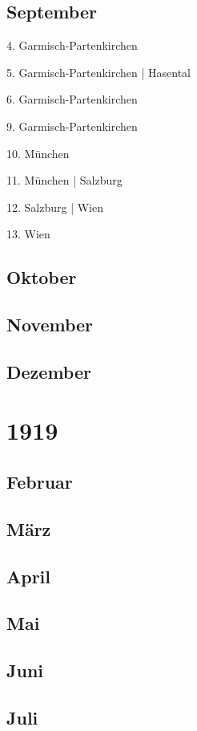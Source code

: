 \documentclass[twoside=false,titlepage=false,open=any, parskip=never, fontsize=10pt, headings=small, chapterprefix=false, appendixprefix=false, DIV=15]{scrbook}
\begin{document}
\begin{multicols}{3}
            \section*{September}
            4. Garmisch-Partenkirchen\par
            5. Garmisch-Partenkirchen | Hasental\par
            6. Garmisch-Partenkirchen\par
            9. Garmisch-Partenkirchen\par
            10. München\par
            11. München | Salzburg\par
            12. Salzburg | Wien\par
            13. Wien\par
            \section*{Oktober}
            \section*{November}
            \section*{Dezember}
            \chapter*{1919}
            \section*{Februar}
            \section*{März}
            \section*{April}
            \section*{Mai}
            \section*{Juni}
            \section*{Juli}

\end{multicols}
\end{document}

